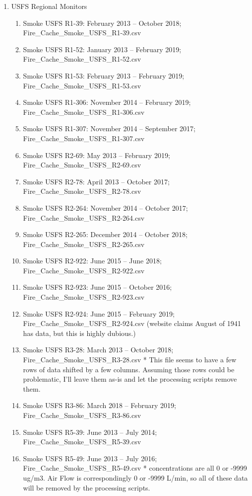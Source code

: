 \begin{enumerate}
\item USFS Regional Monitors
\begin{enumerate}[nolistsep]
\item Smoke USFS R1-39: February 2013 -- October 2018; Fire\_Cache\_Smoke\_USFS\_R1-39.csv
\item Smoke USFS R1-52: January 2013 -- February 2019; Fire\_Cache\_Smoke\_USFS\_R1-52.csv
\item Smoke USFS R1-53: February 2013 -- February 2019; Fire\_Cache\_Smoke\_USFS\_R1-53.csv
\item Smoke USFS R1-306: November 2014 -- February 2019; Fire\_Cache\_Smoke\_USFS\_R1-306.csv
\item Smoke USFS R1-307: November 2014 -- September 2017; Fire\_Cache\_Smoke\_USFS\_R1-307.csv
\item Smoke USFS R2-69: May 2013 -- February 2019; Fire\_Cache\_Smoke\_USFS\_R2-69.csv
\item Smoke USFS R2-78: April 2013 -- October 2017; Fire\_Cache\_Smoke\_USFS\_R2-78.csv
\item Smoke USFS R2-264: November 2014 -- October 2017; Fire\_Cache\_Smoke\_USFS\_R2-264.csv
\item Smoke USFS R2-265: December 2014 -- October 2018; Fire\_Cache\_Smoke\_USFS\_R2-265.csv
\item Smoke USFS R2-922: June 2015 -- June 2018; Fire\_Cache\_Smoke\_USFS\_R2-922.csv
\item Smoke USFS R2-923: June 2015 -- October 2016; Fire\_Cache\_Smoke\_USFS\_R2-923.csv
\item Smoke USFS R2-924: June 2015 -- February 2019; Fire\_Cache\_Smoke\_USFS\_R2-924.csv  (website claims August of 1941 has data, but this is highly dubious.)
\item Smoke USFS R3-28: March 2013 -- October 2018; Fire\_Cache\_Smoke\_USFS\_R3-28.csv  * This file seems to have a few rows of data shifted by a few columns. Assuming those rows could be problematic, I'll leave them as-is and let the processing scripts remove them.
\item Smoke USFS R3-86: March 2018 -- February 2019; Fire\_Cache\_Smoke\_USFS\_R3-86.csv
\item Smoke USFS R5-39: June 2013 -- July 2014; Fire\_Cache\_Smoke\_USFS\_R5-39.csv
\item Smoke USFS R5-49: June 2013 -- July 2016; Fire\_Cache\_Smoke\_USFS\_R5-49.csv * concentrations are all 0 or -9999 ug/m3. Air Flow is correspondingly 0 or -9999 L/min, so all of these data will be removed by the processing scripts. 

\end{enumerate}
\end{enumerate}
